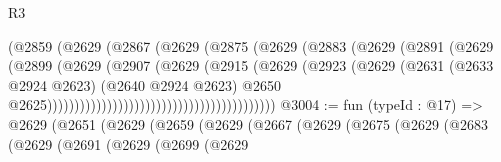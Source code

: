 \begin{lexlean}{R3}
\begin{coremodule}
                                                  (@2859
                                                    (@2629
                                                      (@2867
                                                        (@2629
                                                          (@2875
                                                            (@2629
                                                              (@2883
                                                                (@2629
                                                                  (@2891
                                                                    (@2629
                                                                      (@2899
                                                                        (@2629
                                                                          (@2907
                                                                            (@2629
                                                                              (@2915
                                                                                (@2629
                                                                                  (@2923
                                                                                    (@2629
                                                                                      (@2631
                                                                                        (@2633
                                                                                          @2924
                                                                                          @2623)
                                                                                        (@2640
                                                                                          @2924
                                                                                          @2623)
                                                                                        @2650
                                                                                        @2625))))))))))))))))))))))))))))))))))))))))))
@3004 := fun (typeId : @17) =>
  @2629
    (@2651
      (@2629
        (@2659
          (@2629
            (@2667
              (@2629
                (@2675
                  (@2629
                    (@2683
                      (@2629
                        (@2691
                          (@2629
                            (@2699
                              (@2629

\end{coremodule}
\end{lexlean}
